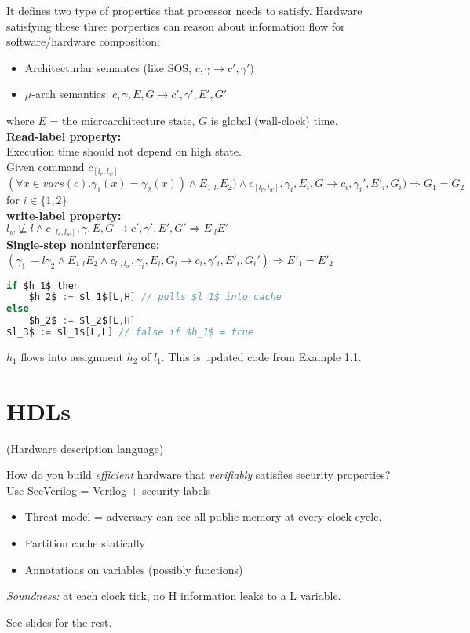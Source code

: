 \documentclass{article}
\begin{document}
It defines two type of properties that processor needs to satisfy. Hardware satisfying these three porperties can reason about information flow for software/hardware composition: \\
\begin{itemize}
	\item{Architecturlar semantcs (like SOS, $c,\gamma \longrightarrow c',\gamma'$)}
	\item{$\mu$-arch semantics: $c,\gamma,E,G \longrightarrow c',\gamma',E',G'$}
\end{itemize}

where $E$ =  the microarchitecture state, $G$ is global (wall-clock) time. \\
 
\textbf{Read-label property:} \\
Execution time should not depend on high state. \\
Given command $c_[l_r,l_w]$ \\
$(\forall x \in vars(c) . \gamma_1(x) = \gamma_2(x)) \land E_1 ~_{l_r} E_2) \land c_[l_r,l_w],\gamma_i,E_i,G \longrightarrow c_i,\gamma_i',E'_i,G_i)  \Rightarrow G_1 = G_2$ for $i \in 
\{1,2\}$ \\

\textbf{write-label property:}\\
$l_w \not\sqsubseteq l \land c_{[l_r,l_w]}, \gamma,E,G \longrightarrow c', \gamma',E',G' \Rightarrow E ~_l E' $ \\

\textbf{Single-step noninterference:} \\
$(\gamma_1 ~-l \gamma_2 \land E_1 ~_l E_2 \land c_{l_r,l_w},\gamma_i,E_i,G_i \longrightarrow c_i,\gamma'_i,E'_i,G_i') \Rightarrow E'_1 = E'_2$


\begin{lstlisting}[mathescape,frame=single,basicstyle=\ttfamily,language=java]
if $h_1$ then
    $h_2$ := $l_1$[L,H] // pulls $l_1$ into cache
else 
    $h_2$ := $l_2$[L,H]
$l_3$ := $l_1$[L,L] // false if $h_1$ = true
\end{lstlisting}
$h_1$ flows into assignment $h_2$ of $l_1$. This is updated code from Example 1.1.

\section{HDLs}
(Hardware description language)

How do you build \emph{efficient} hardware that \emph{verifiably} satisfies security properties?
Use SecVerilog = Verilog + security labels

\begin{itemize}
\item Threat model = adversary can see all public memory at every clock cycle.

\item Partition cache statically

\item Annotations on variables (possibly functions)
  
\end{itemize}

\emph{Soundness:} at each clock tick, no H information leaks to a L variable.
  
See slides for the rest. 
\end{document}

